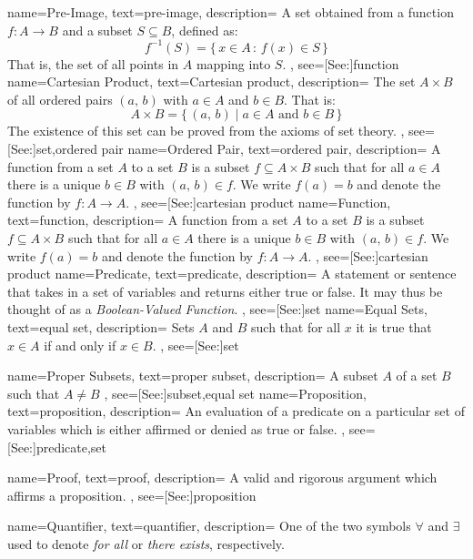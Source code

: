 {
    name={Pre-Image},
    text={pre-image},
    description={
        A set obtained from a function $f:A\rightarrow{B}$
        and a subset $S\subseteq{B}$, defined as:
        \begin{equation*}
            f^{\minus{1}}(S)=\{\,x\in{A}\,:\,f(x)\in{S}\,\}
        \end{equation*}
        That is, the set of all points in $A$ mapping into $S$.
    },
    see=[See:]{function}
}
{
    name={Cartesian Product},
    text={Cartesian product},
    description={
        The set $A\times{B}$ of all ordered pairs $(a,\,b)$ with
        $a\in{A}$ and $b\in{B}$. That is:
        \begin{equation*}
            A\times{B}=\{\,(a,\,b)\;|\;a\in{A}\textrm{ and }b\in{B}\,\}
        \end{equation*}
        The existence of this set can be proved from the axioms of set theory.
    },
    see=[See:]{set,ordered pair}
}
{
    name={Ordered Pair},
    text={ordered pair},
    description={
        A function from a set $A$ to a set $B$ is a subset
        $f\subseteq{A}\times{B}$ such that for all $a\in{A}$ there is a
        unique $b\in{B}$ with $(a,\,b)\in{f}$. We write $f(a)=b$ and denote
        the function by $f:A\rightarrow{A}$.
    },
    see=[See:]{cartesian product}
}
{
    name={Function},
    text={function},
    description={
        A function from a set $A$ to a set $B$ is a subset
        $f\subseteq{A}\times{B}$ such that for all $a\in{A}$ there is a
        unique $b\in{B}$ with $(a,\,b)\in{f}$. We write $f(a)=b$ and denote
        the function by $f:A\rightarrow{A}$.
    },
    see=[See:]{cartesian product}
}
{
    name={Predicate},
    text={predicate},
    description={
        A statement or sentence that takes in a set of variables and returns
        either true or false. It may thus be thought of as a
        \textit{Boolean-Valued Function}.
    },
    see=[See:]{set}
}
{
    name={Equal Sets},
    text={equal set},
    description={
        Sets $A$ and $B$ such that for all $x$ it is true that
        $x\in{A}$ if and only if $x\in{B}$.
    },
    see=[See:]{set}
}

{
    name={Proper Subsets},
    text={proper subset},
    description={
        A subset $A$ of a set $B$ such that $A\ne{B}$
    },
    see=[See:]{subset,equal set}
}
{
    name={Proposition},
    text={proposition},
    description={
        An evaluation of a predicate on a particular set of variables which is
        either affirmed or denied as true or false.
    },
    see=[See:]{predicate,set}
}

{
    name={Proof},
    text={proof},
    description={
        A valid and rigorous argument which affirms a proposition.
    },
    see=[See:]{proposition}
}


{
    name={Quantifier},
    text={quantifier},
    description={
        One of the two symbols $\forall$ and $\exists$ used to denote
        \textit{for all} or \textit{there exists}, respectively.
    }
}
